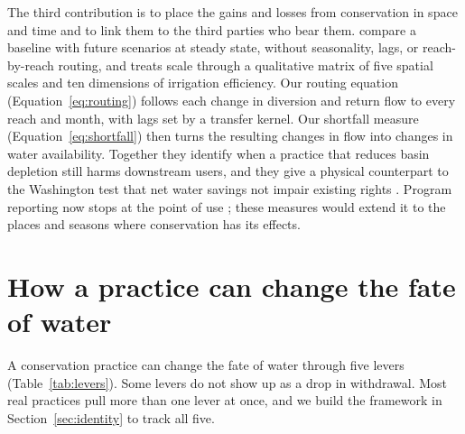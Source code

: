 \documentclass[11pt]{article}
\begin{document}
The third contribution is to place the gains and losses from conservation in space and time and to link them to the third parties who bear them. \citet{lankford2023} compare a baseline with future scenarios at steady state, without seasonality, lags, or reach-by-reach routing, and \citet{lankford2020} treats scale through a qualitative matrix of five spatial scales and ten dimensions of irrigation efficiency. Our routing equation (Equation~\eqref{eq:routing}) follows each change in diversion and return flow to every reach and month, with lags set by a transfer kernel. Our shortfall measure (Equation~\eqref{eq:shortfall}) then turns the resulting changes in flow into changes in water availability. Together they identify when a practice that reduces basin depletion still harms downstream users, and they give a physical counterpart to the Washington test that net water savings not impair existing rights \citep{rcw9042020}. Program reporting now stops at the point of use \citep{wadraft2026}; these measures would extend it to the places and seasons where conservation has its effects.

\section{How a practice can change the fate of water}\label{sec:levers}

A conservation practice can change the fate of water through five levers (Table~\ref{tab:levers}). Some levers do not show up as a drop in withdrawal. Most real practices pull more than one lever at once, and we build the framework in Section~\ref{sec:identity} to track all five.
\end{document}

